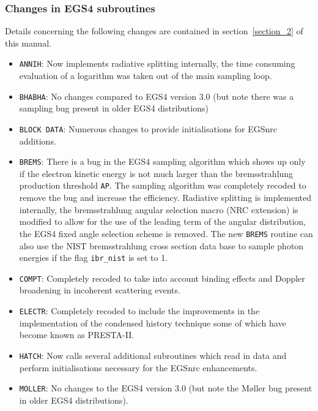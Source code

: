 \subsubsection{Changes in EGS4 subroutines}

Details concerning the following changes are contained in
section~\ref{section_2} of this manual.

\begin{itemize}
\item
{\tt ANNIH}: Now implements radiative splitting internally,
the time consuming evaluation of a logarithm
was taken out of the main sampling loop.

\item
{\tt BHABHA}: No changes compared to EGS4 version 3.0
(but note there was a sampling bug present in older
EGS4 distributions\cite{Bi96b})

\item
{\tt BLOCK DATA}: Numerous changes to provide initialisations for EGSnrc
additions.  

\item
{\tt BREMS}: There is a bug in the EGS4 sampling algorithm which shows
up only if the electron kinetic energy is not much larger than the
bremsstrahlung production threshold {\tt AP}. The sampling algorithm
was completely recoded to remove the bug and increase the efficiency.
Radiative splitting is implemented internally, the bremsstrahlung angular
selection macro (NRC extension) is modified to allow for the use of the
leading term of the angular distribution, the EGS4 fixed angle selection
scheme is removed.  The new {\tt BREMS} routine can also use the NIST
bremsstrahlung cross section data base to sample photon energies if the
flag {\tt ibr\_nist} is set to 1.


\item
{\tt COMPT}: Completely recoded to take into account binding
effects and Doppler broadening in incoherent scattering events.
\item
{\tt ELECTR}: Completely recoded to include the
improvements in the implementation of the condensed history
technique some of which have become known as PRESTA-II.
\item
{\tt HATCH}: Now calls several additional subroutines
which read in data and perform initialisations necessary
for the EGSnrc enhancements.

\item
{\tt MOLLER}: No changes to the EGS4 version 3.0
(but note the M{\o}ller bug present in older
EGS4 distributions\cite{Bi96b}).


\end{itemize}
